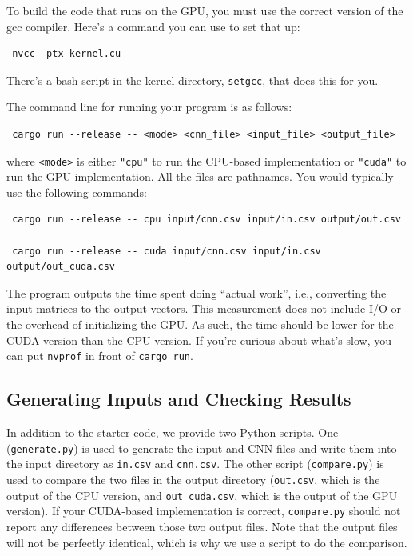 To build the code that runs on the GPU, you must use the correct version of the gcc compiler. Here's a command you can use to set that up:

\begin{verbatim}
 nvcc -ptx kernel.cu
\end{verbatim}


There's a bash script in the kernel directory, \texttt{setgcc}, that does this for you.

The command line for running your program is as follows:


\begin{verbatim}
 cargo run --release -- <mode> <cnn_file> <input_file> <output_file>
\end{verbatim}


where \texttt{<mode>} is either \texttt{"cpu"} to run the CPU-based implementation or \texttt{"cuda"} to run the GPU implementation. All the files are pathnames. You would typically use the following commands:


\begin{verbatim}
 cargo run --release -- cpu input/cnn.csv input/in.csv output/out.csv

 cargo run --release -- cuda input/cnn.csv input/in.csv output/out_cuda.csv
\end{verbatim}


The program outputs the time spent doing ``actual work'', i.e., converting the input matrices to the output vectors. This measurement does not include I/O or the overhead of initializing the GPU. As such, the time should be lower for the CUDA version than the CPU version. If you're curious about what's slow, you can put \texttt{nvprof} in front of \texttt{cargo run}.




\subsection*{Generating Inputs and Checking Results}




In addition to the starter code, we provide two Python scripts. One (\texttt{generate.py}) is used to generate the input and CNN files and write them into the input directory as \texttt{in.csv} and \texttt{cnn.csv}. The other script (\texttt{compare.py}) is used to compare the two files in the output directory (\texttt{out.csv}, which is the output of the CPU version, and \texttt{out\_cuda.csv}, which is the output of the GPU version). If your CUDA-based implementation is correct, \texttt{compare.py} should not report any differences between those two output files. Note that the output files will not be perfectly identical, which is why we use a script to do the comparison.


